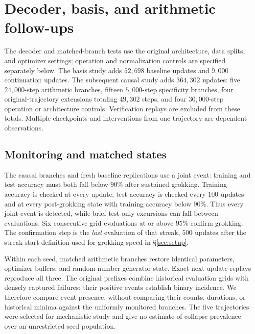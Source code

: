 \section{Decoder, basis, and arithmetic follow-ups}
\label{app:followup}

The decoder and matched-branch tests use the original architecture, data splits, and optimizer settings; operation and normalization controls are specified separately below. The basis study adds $52{,}698$ baseline updates and $9{,}000$ continuation updates. The subsequent causal study adds $364{,}302$ updates: five $24{,}000$-step arithmetic branches, fifteen $5{,}000$-step specificity branches, four original-trajectory extensions totaling $49{,}302$ steps, and four $30{,}000$-step operation or architecture controls. Verification replays are excluded from these totals. Multiple checkpoints and interventions from one trajectory are dependent observations.

\subsection{Monitoring and matched states}
\label{app:followup-protocol}

The causal branches and fresh baseline replications use a joint event: training and test accuracy must both fall below $90\%$ after sustained grokking. Training accuracy is checked at every update; test accuracy is checked every $100$ updates and at every post-grokking state with training accuracy below $90\%$. Thus every joint event is detected, while brief test-only excursions can fall between evaluations. Six consecutive grid evaluations at or above $95\%$ confirm grokking. The confirmation step is the \emph{last} evaluation of that streak, $500$ updates after the streak-start definition used for grokking speed in \S\ref{sec:setup}.

Within each seed, matched arithmetic branches restore identical parameters, optimizer buffers, and random-number-generator state. Exact next-update replays reproduce all three. The original prefixes combine historical evaluation grids with densely captured failures; their positive events establish binary incidence. We therefore compare event presence, without comparing their counts, durations, or historical minima against the uniformly monitored branches. The five trajectories were selected for mechanistic study and give no estimate of collapse prevalence over an unrestricted seed population.

